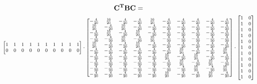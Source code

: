 \documentclass[a4paper,12pt]{article}
\begin{document}
	
	\[ {\bf C^T B C} = \] 
	\[\small \begin{bmatrix}
		1 & 1 & 1 & 1 & 1 & 1 & 1 & 1 & 1 & 1 \\
		0 & 0 & 0 & 0 & 0 & 0 & 0 & 0 & 0 & 0 \\
	\end{bmatrix}\cdot  \begin{bmatrix}
		-\frac{4}{20}& \frac{16}{20}& -\frac{4}{20}& -\frac{4}{20}& \frac{16}{20}& -\frac{4}{20}& -\frac{4}{20}& -\frac{4}{20}& -\frac{4}{20}& -\frac{4}{20}\\
		\frac{16}{20}& -\frac{4}{20}& \frac{16}{20}& -\frac{4}{20}& -\frac{4}{20}& -\frac{4}{20}& -\frac{4}{20}& -\frac{4}{20}& -\frac{4}{20}& -\frac{4}{20}\\
		-\frac{4}{20}& \frac{16}{20}& -\frac{4}{20}& \frac{16}{20}& -\frac{4}{20}& -\frac{4}{20}& -\frac{4}{20}& -\frac{4}{20}& -\frac{4}{20}& -\frac{4}{20}\\
		-\frac{4}{20}& -\frac{4}{20}& \frac{16}{20}& -\frac{4}{20}& \frac{16}{20}& -\frac{4}{20}& -\frac{4}{20}& -\frac{4}{20}& -\frac{4}{20}& -\frac{4}{20}\\
		\frac{16}{20}& -\frac{4}{20}& -\frac{4}{20}& \frac{16}{20}& -\frac{4}{20}& -\frac{4}{20}& -\frac{4}{20}& -\frac{4}{20}& -\frac{4}{20}& -\frac{4}{20}\\
		-\frac{4}{20}& -\frac{4}{20}& -\frac{4}{20}& -\frac{4}{20}& -\frac{4}{20}& -\frac{4}{20}& \frac{16}{20}& -\frac{4}{20}& -\frac{4}{20}& \frac{16}{20}\\
		-\frac{4}{20}& -\frac{4}{20}& -\frac{4}{20}& -\frac{4}{20}& -\frac{4}{20}& \frac{16}{20}& -\frac{4}{20}& \frac{16}{20}& -\frac{4}{20}& -\frac{4}{20}\\
		-\frac{4}{20}& -\frac{4}{20}& -\frac{4}{20}& -\frac{4}{20}& -\frac{4}{20}& -\frac{4}{20}& \frac{16}{20}& -\frac{4}{20}& \frac{16}{20}& -\frac{4}{20}\\
		-\frac{4}{20}& -\frac{4}{20}& -\frac{4}{20}& -\frac{4}{20}& -\frac{4}{20}& -\frac{4}{20}& -\frac{4}{20}& \frac{16}{20}& -\frac{4}{20}& \frac{16}{20}\\
		-\frac{4}{20}& -\frac{4}{20}& -\frac{4}{20}& -\frac{4}{20}& -\frac{4}{20}& \frac{16}{20}& -\frac{4}{20}& -\frac{4}{20}& \frac{16}{20}& -\frac{4}{20}
	\end{bmatrix} \cdot 
	\begin{bmatrix}
		1 & 0 \\ 
		1 & 0 \\
		1 & 0 \\
		1 & 0 \\ 
		1 & 0 \\ 
		1 & 0 \\ 
		1 & 0 \\ 
		1 & 0 \\ 
		1 & 0 \\ 
		1 & 0 \\ 
		1 & 0 
	\end{bmatrix}\]
	
\end{document}

